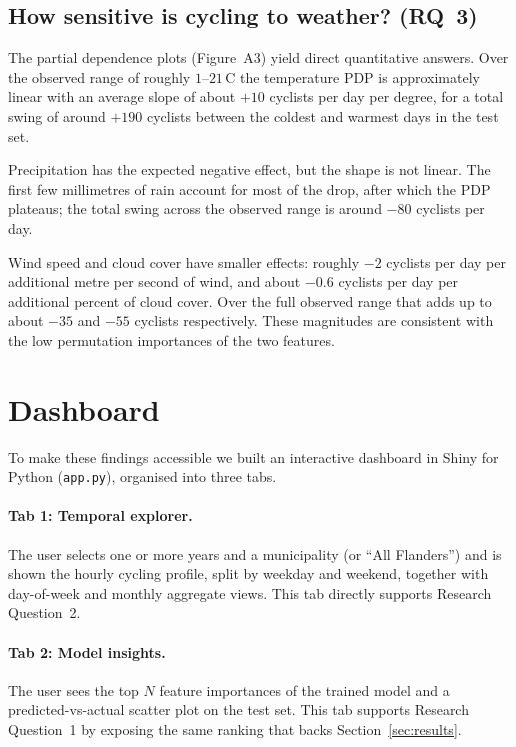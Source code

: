 \documentclass[11pt,a4paper]{article}
\begin{document}
\subsection{How sensitive is cycling to weather? (RQ~3)}

The partial dependence plots (Figure~A3) yield direct quantitative
answers. Over the observed range of roughly $1$--$21$\,\textdegree{}C
the temperature PDP is approximately linear with an average slope of
about $+10$ cyclists per day per degree, for a total swing of around
$+190$ cyclists between the coldest and warmest days in the test set.

Precipitation has the expected negative effect, but the shape is not
linear. The first few millimetres of rain account for most of the
drop, after which the PDP plateaus; the total swing across the
observed range is around $-80$ cyclists per day.

Wind speed and cloud cover have smaller effects: roughly $-2$ cyclists
per day per additional metre per second of wind, and about $-0.6$
cyclists per day per additional percent of cloud cover. Over the full
observed range that adds up to about $-35$ and $-55$ cyclists
respectively. These magnitudes are consistent with the low permutation
importances of the two features.

\section{Dashboard}
\label{sec:dashboard}

To make these findings accessible we built an interactive dashboard in
Shiny for Python (\texttt{app.py}), organised into three tabs.

\paragraph{Tab 1: Temporal explorer.}
The user selects one or more years and a municipality (or
\enquote{All Flanders}) and is shown the hourly cycling profile, split
by weekday and weekend, together with day-of-week and monthly
aggregate views. This tab directly supports Research Question~2.

\paragraph{Tab 2: Model insights.}
The user sees the top $N$ feature importances of the trained model
and a predicted-vs-actual scatter plot on the test set. This tab
supports Research Question~1 by exposing the same ranking that backs
Section~\ref{sec:results}.
\end{document}
